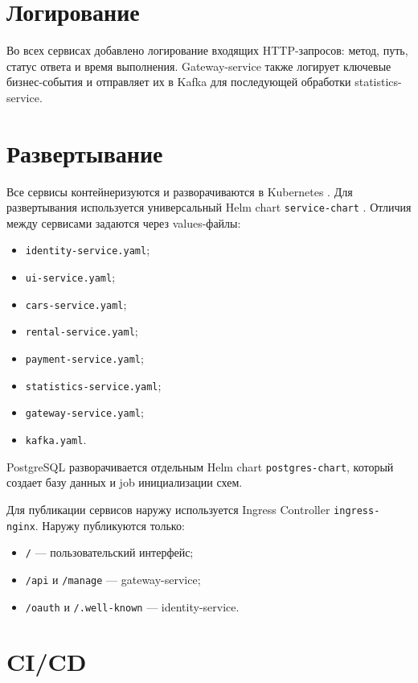 \section{Логирование}

Во всех сервисах добавлено логирование входящих HTTP-запросов: метод, путь, статус ответа и время выполнения. Gateway-service также логирует ключевые бизнес-события и отправляет их в Kafka для последующей обработки statistics-service.

\section{Развертывание}

Все сервисы контейнеризуются и разворачиваются в Kubernetes \cite{kubernetes}. Для развертывания используется универсальный Helm chart \texttt{service-chart} \cite{helm}. Отличия между сервисами задаются через values-файлы:

\begin{itemize}
  \item \texttt{identity-service.yaml};
  \item \texttt{ui-service.yaml};
  \item \texttt{cars-service.yaml};
  \item \texttt{rental-service.yaml};
  \item \texttt{payment-service.yaml};
  \item \texttt{statistics-service.yaml};
  \item \texttt{gateway-service.yaml};
  \item \texttt{kafka.yaml}.
\end{itemize}

PostgreSQL разворачивается отдельным Helm chart \texttt{postgres-chart}, который создает базу данных и job инициализации схем.

Для публикации сервисов наружу используется Ingress Controller \texttt{ingress-nginx}. Наружу публикуются только:

\begin{itemize}
  \item \texttt{/} --- пользовательский интерфейс;
  \item \texttt{/api} и \texttt{/manage} --- gateway-service;
  \item \texttt{/oauth} и \texttt{/.well-known} --- identity-service.
\end{itemize}

\section{CI/CD}

